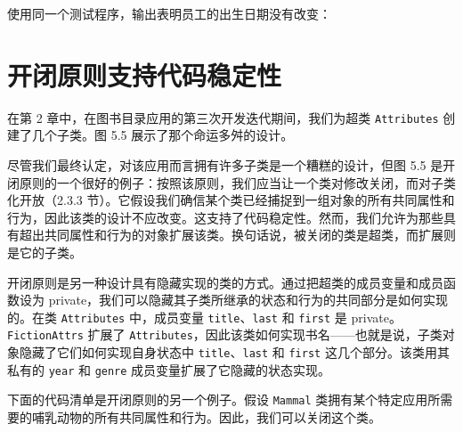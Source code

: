 使用同一个测试程序，输出表明员工的出生日期没有改变：


\section{开闭原则支持代码稳定性}

在第 2 章中，在图书目录应用的第三次开发迭代期间，我们为超类 \texttt{Attributes} 创建了几个子类。图 5.5 展示了那个命运多舛的设计。

尽管我们最终认定，对该应用而言拥有许多子类是一个糟糕的设计，但图 5.5 是开闭原则的一个很好的例子：按照该原则，我们应当让一个类对修改关闭，而对子类化开放（2.3.3 节）。它假设我们确信某个类已经捕捉到一组对象的所有共同属性和行为，因此该类的设计不应改变。这支持了代码稳定性。然而，我们允许为那些具有超出共同属性和行为的对象扩展该类。换句话说，被关闭的类是超类，而扩展则是它的子类。


开闭原则是另一种设计具有隐藏实现的类的方式。通过把超类的成员变量和成员函数设为 private，我们可以隐藏其子类所继承的状态和行为的共同部分是如何实现的。在类 \texttt{Attributes} 中，成员变量 \texttt{title}、\texttt{last} 和 \texttt{first} 是 private。\texttt{Fiction\allowbreak{}Attrs} 扩展了 \texttt{Attributes}，因此该类如何实现书名——也就是说，子类对象隐藏了它们如何实现自身状态中 \texttt{title}、\texttt{last} 和 \texttt{first} 这几个部分。该类用其私有的 \texttt{year} 和 \texttt{genre} 成员变量扩展了它隐藏的状态实现。


下面的代码清单是开闭原则的另一个例子。假设 \texttt{Mammal} 类拥有某个特定应用所需要的哺乳动物的所有共同属性和行为。因此，我们可以关闭这个类。

